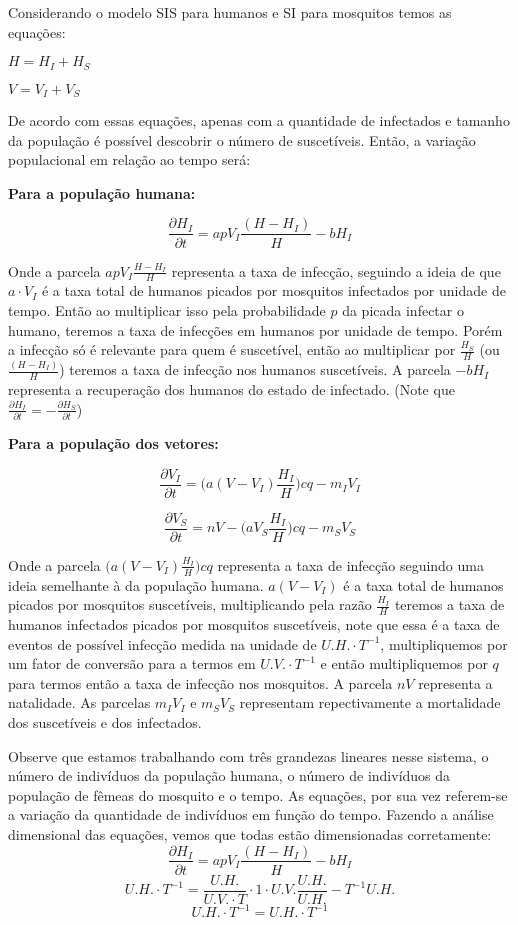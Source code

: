 \documentclass[
	12pt,				%
	openright,			%
	twoside,			%
	a4paper,			%
	english,			%
	french,				%
	spanish,			%
	brazil				%
	]{abntex2}
\begin{document}
Considerando o modelo SIS para humanos e SI para mosquitos temos as equações:

$H = H_I+H_S$
 

$V = V_I + V_S$

De acordo com essas equações, apenas com a quantidade de infectados e tamanho da população é possível descobrir o número de suscetíveis. Então, a variação populacional em relação ao tempo será:

\textbf{Para a população humana:}

$$ \frac{\partial H_I}{\partial t}= a pV_I\frac{(H-H_I)}{H}- b H_I$$

Onde a parcela $a pV_I\frac{H-H_I}{H}$ representa a taxa de infecção, seguindo a ideia de que $a\cdot V_I$ é a taxa total de humanos picados por mosquitos infectados por unidade de tempo. Então ao multiplicar isso pela probabilidade $p$ da picada infectar o humano, teremos a taxa de infecções em humanos por unidade de tempo. Porém a infecção só é relevante para quem é suscetível, então ao multiplicar por $\frac{H_S}{H}$ (ou $\frac{(H-H_I)}{H}$) teremos a taxa de infecção nos humanos suscetíveis.
A parcela $-b H_I$ representa a recuperação dos humanos do estado de infectado. (Note que $\frac{\partial H_I}{\partial t}=-\frac{\partial H_S}{\partial t}$)

\textbf{Para a população dos vetores:}

$$ \frac{\partial V_I}{\partial t}= \Big(a(V-V_I)\frac{H_I}{H}\Big)cq-m_I V_I$$

$$ \frac{\partial V_S}{\partial t}= nV-\Big(aV_S\frac{H_I}{H}\Big)cq-m_S V_S$$

Onde a parcela $\Big(a(V-V_I)\frac{H_I}{H}\Big)cq$ representa a taxa de infecção seguindo uma ideia semelhante à da população humana. $a(V-V_I)$ é a taxa total de humanos picados por mosquitos suscetíveis, multiplicando pela razão $\frac{H_I}{H}$ teremos a taxa de humanos infectados picados por mosquitos suscetíveis, note que essa é a taxa de eventos de possível infecção medida na unidade de $U.H.\cdot T^{-1}$, multipliquemos por um fator de conversão para a termos em $U.V.\cdot T^{-1}$ e então multipliquemos por $q$ para termos então a taxa de infecção nos mosquitos. A parcela $nV$ representa a natalidade. As parcelas $m_IV_I$ e $m_SV_S$ representam repectivamente a mortalidade dos suscetíveis e dos infectados.

Observe que estamos trabalhando com três grandezas lineares nesse sistema, o número de indivíduos da população humana, o número de indivíduos da população de fêmeas do mosquito e o tempo. As equações, por sua vez referem-se a variação da quantidade de indivíduos em função do tempo. Fazendo a análise dimensional das equações, vemos que todas estão dimensionadas corretamente:
$$ \frac{\partial H_I}{\partial t}= a pV_I\frac{(H-H_I)}{H}- b H_I$$
$$U.H.\cdot T^{-1}=\frac{U.H.}{U.V.\cdot T}\cdot 1\cdot U.V.\frac{U.H.}{U.H.} - T^{-1}U.H.$$
$$U.H.\cdot T^{-1}=U.H.\cdot T^{-1}$$
\end{document}
